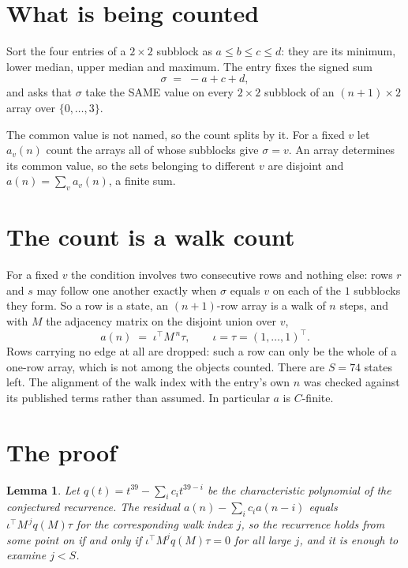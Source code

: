 \documentclass[11pt,a4paper]{article}
\theoremstyle{plain}
\newtheorem{lemma}[theorem]{Lemma}
\theoremstyle{definition}
\begin{document}
\section{What is being counted}

Sort the four entries of a $2\times2$ subblock as $a\le b\le c\le d$: they
are its minimum, lower median, upper median and maximum. The entry fixes the signed sum
\[
\sigma\;=\;-a+c+d,
\]
and asks that $\sigma$ take the SAME value on every $2\times2$ subblock of an
$(n+1)\times2$ array over $\{0,\dots,3\}$.

The common value is not named, so the count splits by it. For a fixed $v$ let $a_v(n)$ count
the arrays all of whose subblocks give $\sigma=v$. An array determines its common value, so
the sets belonging to different $v$ are disjoint and $a(n)=\sum_v a_v(n)$, a finite sum.


\section{The count is a walk count}

For a fixed $v$ the condition involves two consecutive rows and nothing
else: rows $r$ and $s$ may follow one another exactly when $\sigma$ equals $v$ on each of the
$1$ subblocks they form. So a row is a state, an $(n+1)$-row array is a walk of $n$
steps, and with $M$ the adjacency matrix on the disjoint union over $v$,
\[
a(n)\;=\;\iota^{\!\top}M^{\,n}\tau,\qquad\iota=\tau=(1,\dots,1)^{\!\top} .
\]
Rows carrying no edge at all are dropped: such a row can only be the whole of a one-row
array, which is not among the objects counted. There are $S=74$ states left.
The alignment of the walk index with the entry's own $n$ was checked against its published
terms rather than assumed. In particular $a$ is $C$-finite.

\section{The proof}

\begin{lemma}\label{lem:crit}
Let $q(t)=t^{39}-\sum_i c_it^{39-i}$ be the characteristic polynomial of the
conjectured recurrence. The residual $a(n)-\sum_ic_ia(n-i)$ equals
$\iota^{\!\top}M^{\,j}q(M)\tau$ for the corresponding walk index $j$, so the recurrence
holds from some point on if and only if $\iota^{\!\top}M^{j}q(M)\tau=0$ for all large $j$,
and it is enough to examine $j<S$.
\end{lemma}
\end{document}
